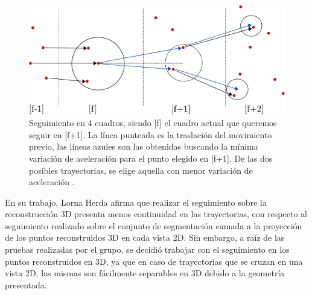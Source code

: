 \begin{figure}[ht!]
\begin{center}
\includegraphics[scale=0.8]{img/Tracking/tracking-eps-converted-to.pdf}
\end{center}
\caption{Seguimiento en 4 cuadros, siendo [f] el cuadro actual que queremos seguir en [f+1]. La línea punteada es la traslación del movimiento previo, las líneas azules son las obtenidas buscando la mínima variación de aceleración para el punto elegido en [f+1]. De las dos posibles trayectorias, se elige aquella con menor variación de aceleración \cite{herda}.}
\label{herda_00}
\end{figure}

En su trabajo, Lorna Herda afirma que realizar el seguimiento sobre la reconstrucción 3D presenta menos continuidad en las trayectorias, con respecto al seguimiento realizado sobre el conjunto de segmentación sumada a la proyección de los puntos reconstruidos 3D en cada vista 2D. Sin embargo, a raíz de las pruebas realizadas por el grupo, se decidió trabajar con el seguimiento en los puntos reconstruidos en 3D, ya que en caso de trayectorias que se cruzan en una vista 2D, las mismas son fácilmente separables en 3D debido a la geometría presentada.
\\ 

